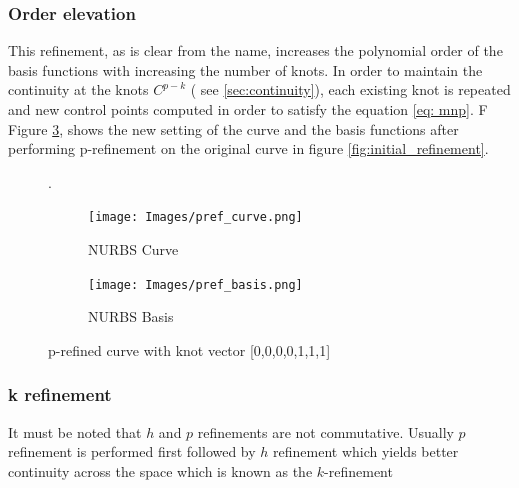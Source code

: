 \documentclass[12pt, a4paper]{report}
\begin{document}
\subsubsection{Order elevation  \cite{nurbs_refinement}}
This refinement, as is clear from the name, increases the polynomial order of the basis functions with increasing the number of knots. In order to maintain the continuity at the knots $C^{p-k}$ ( see \ref{sec:continuity}), each existing knot is repeated and new control points computed in order to satisfy the equation \ref{eq: mnp}. F
Figure \ref{fig:pref}, shows the new setting of the curve and the basis functions after performing p-refinement on the original curve in figure \ref{fig:initial_refinement}.
\begin{figure}[H].
\centering
\begin{subfigure}{.5\textwidth}
  \centering
  \texttt{[image: Images/pref\_curve.png]}
  \caption{NURBS Curve}
  \label{fig:pref_curve}
\end{subfigure}%
\begin{subfigure}{.6\textwidth}
  \centering
  \texttt{[image: Images/pref\_basis.png]}
  \caption{NURBS Basis}
  \label{fig:pref_basis}
\end{subfigure}
\caption{p-refined curve with knot vector [0,0,0,0,1,1,1]}
\label{fig:pref}
\end{figure}
\subsubsection{k refinement }
It must be noted that $h$ and $p$ refinements are not commutative. Usually $p$ refinement is performed first followed by $h$ refinement which yields better continuity across the space which is known as the $k$-refinement
\end{document}
